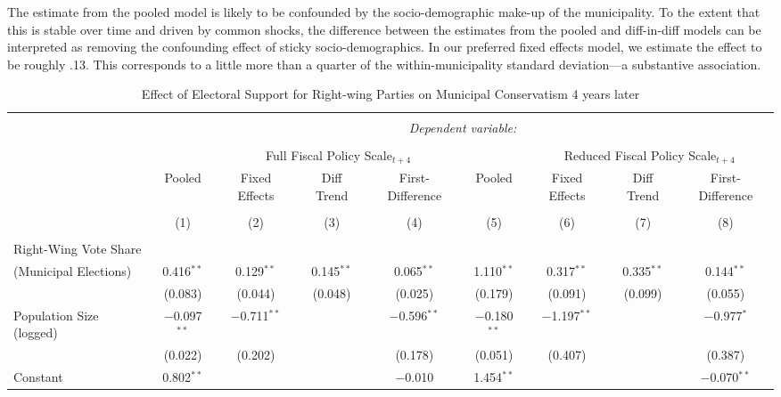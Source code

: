 \documentclass[a4paper,12pt]{article}
\begin{document}
The estimate from the pooled model is likely to be confounded by the socio-demographic make-up of the municipality. To the extent that this is stable over time and driven by common shocks, the difference between the estimates from the pooled and diff-in-diff models can be interpreted as removing the confounding effect of sticky socio-demographics. In our preferred fixed effects model, we estimate the effect to be roughly .13. This corresponds to a little more than a quarter of the within-municipality standard deviation---a substantive association. 


\begin{landscape}
	
	
	\begin{table}[!htbp] \centering 
		\caption{Effect of Electoral Support for Right-wing Parties on Municipal Conservatism 4 years later} 
		\label{tab:FourYearLead} 
		\begin{tabular}{@{\extracolsep{5pt}}lcccccccc} 
			\\[-1.8ex]\hline 
			\hline \\[-1.8ex] 
			& \multicolumn{8}{c}{\textit{Dependent variable:}} \\ 
			\cline{2-9} 
			\\[-1.8ex] & & \multicolumn{3}{c}{Full Fiscal Policy Scale$_{t+4}$} & 	&\multicolumn{3}{c}{Reduced Fiscal Policy Scale$_{t+4}$}   \\ 
			& Pooled & Fixed Effects & Diff Trend & First-Difference & Pooled & Fixed Effects & Diff Trend & First-Difference \\ 
			\\[-1.8ex] & (1) & (2) & (3) & (4) & (5) & (6) & (7) & (8)\\ 
			\hline \\[-1.8ex] 
		Right-Wing Vote Share\\(Municipal Elections)  & 0.416$^{**}$ & 0.129$^{**}$ & 0.145$^{**}$ & 0.065$^{**}$  & 1.110$^{**}$ & 0.317$^{**}$ & 0.335$^{**}$ & 0.144$^{**}$ \\ 
			& (0.083) & (0.044) & (0.048) & (0.025)  & (0.179) & (0.091) & (0.099) &  (0.055) \\ 
			Population Size (logged) & $-$0.097$^{**}$ & $-$0.711$^{**}$ &  & $-$0.596$^{**}$  & $-$0.180$^{**}$ & $-$1.197$^{**}$ &  & $-$0.977$^{*}$ \\ 
			& (0.022) & (0.202) &  & (0.178)  & (0.051) & (0.407) &  &  (0.387) \\ 
			Constant & 0.802$^{**}$ &  &  & $-$0.010 & 1.454$^{**}$ &  &  & $-$0.070$^{**}$ \\ 

\end{tabular}
\end{table}
\end{landscape}
\end{document}
